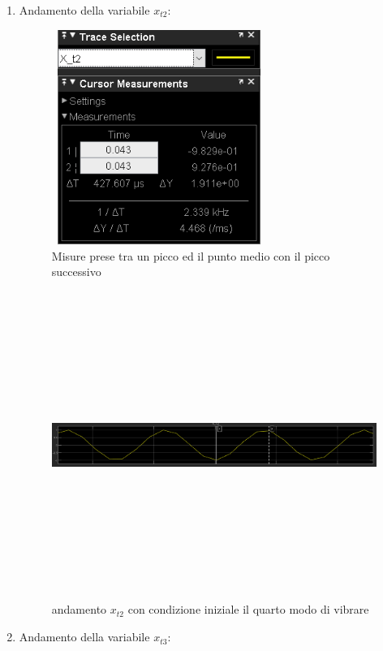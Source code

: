 \documentclass{article}
\begin{document}
\begin{enumerate}
    \item
            Andamento della variabile $x_{t2}$:
    
\begin{figure}[H]
\centering
\includegraphics[width=7cm,height=7cm,keepaspectratio]{./simulink/assex/modo4_t2tab.png}
\caption{Misure prese tra un picco ed il punto medio con il picco successivo}
\end{figure}

\begin{figure}[H]
\centering
\includegraphics[width=12cm,height=10cm,keepaspectratio]{./simulink/assex/modo4_t2.png}
\caption{andamento $x_{t2}$ con condizione iniziale il quarto modo di vibrare}
\end{figure}
      
    \item 
       Andamento della variabile $x_{t3}$:


\end{enumerate}
\end{document}
